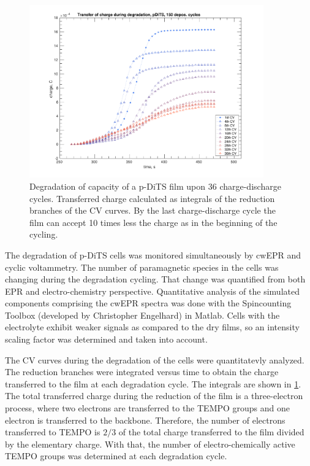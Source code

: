 \begin{figure}[ht!]
\includegraphics[width=0.9\textwidth]{./operando_epr/figures/degradation/Figure_S10}
\caption{Degradation of capacity of a p-DiTS film upon 36 charge-discharge cycles. Transferred charge calculated as integrals of the reduction branches of the CV curves. By the last charge-discharge cycle the film can accept 10 times less the charge as in the beginning of the cycling.}
\label{fig:S10}
\end{figure}


The degradation of p-DiTS cells was monitored simultaneously by cwEPR and cyclic voltammetry. The number of paramagnetic species in the cells was changing during the degradation cycling. That change was quantified from both EPR and electro-chemistry perspective. Quantitative analysis of the simulated components comprising the cwEPR spectra was done with the Spincounting Toolbox\cite{spin_counting_tb} (developed by Christopher Engelhard) in Matlab. Cells with the electrolyte exhibit weaker signals as compared to the dry films, so an intensity scaling factor was determined and taken into account.

\bigbreak

The CV curves during the degradation of the cells were quantitatevly analyzed. The reduction branches were integrated versus time to obtain the charge transferred to the film at each degradation cycle. The integrals are shown in \ref{fig:S10}. The total transferred charge during the reduction of the film is a three-electron process,\cite{si_vereshchagin2020_battandsupercaps} where two electrons are transferred to the TEMPO groups and one electron is transferred to the backbone. Therefore, the number of electrons transferred to TEMPO is $2/3$ of the total charge transferred to the film divided by the elementary charge. With that, the number of electro-chemically active TEMPO groups was determined at each degradation cycle.

